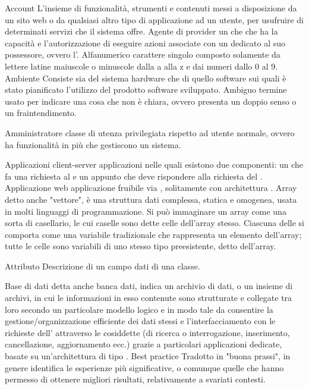 \elemento
{Account} 
{L'insieme di funzionalità, strumenti e contenuti messi a disposizione da un sito web o da qualsiasi altro tipo di applicazione ad un utente, per usufruire di determinati servizi che il sistema offre.}
\elemento
{Agente di provider} 
{un  che che ha la capacità e l'autorizzazione di eseguire azioni associate con un  dedicato al suo possessore, ovvero l'.}
\elemento
{Alfanumerico}
{carattere singolo composto solamente da lettere latine maiuscole o minuscole dalla a alla z e dai numeri dallo 0 al 9.}
\elemento
{Ambiente}
{Consiste sia del sistema hardware che di quello software sui quali è stato pianificato l'utilizzo del prodotto software sviluppato.}
\elemento
{Ambiguo}
{termine usato per indicare una cosa che non è chiara, ovvero presenta un doppio senso o un fraintendimento.}

\elemento
{Amministratore} 
{classe di utenza privilegiata rispetto ad utente normale, ovvero ha funzionalità in più che gestiscono un sistema.}

\elemento
{Applicazioni client-server}
{applicazioni nelle quali esistono due componenti: un  che fa una richiesta al  e un  appunto che deve rispondere alla richiesta del .}
\elemento
{Applicazione web} 
{applicazione fruibile via , solitamente con architettura .}
\elemento
{Array} 
{detto anche "vettore", è una struttura dati complessa, statica e omogenea, usata in molti linguaggi di programmazione. Si può immaginare un array come una sorta di casellario, le cui caselle sono dette celle dell'array stesso. Ciascuna delle  si comporta come una variabile tradizionale che rappresenta un elemento dell'array; tutte le celle sono variabili di uno stesso tipo preesistente, detto  dell'array.}

\elemento
{Attributo}
{Descrizione di un campo dati di una classe.}

\elemento
{Base di dati} 
{detta anche banca dati, indica un archivio di dati, o un insieme di archivi, in cui le informazioni in esso contenute sono strutturate e collegate tra loro secondo un particolare modello logico e in modo tale da consentire la gestione/organizzazione efficiente dei dati stessi e l'interfacciamento con le richieste dell' attraverso le cosiddette  (di ricerca o interrogazione, inserimento, cancellazione, aggiornamento ecc.) grazie a particolari applicazioni  dedicate, basate su un'architettura di tipo .}
\elemento
{Best practice} 
{Tradotto in "buona prassi", in genere identifica le esperienze più significative, o comunque quelle che hanno permesso di ottenere migliori risultati, relativamente a svariati contesti.}

